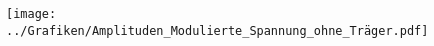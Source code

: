 
\FloatBarrier\begin{figure}[!h]
\centering
\texttt{[image: ../Grafiken/Amplituden\_Modulierte\_Spannung\_ohne\_Träger.pdf]}
\caption{\label{fig:amplituden_modulierte_spannung_ohne_träger}}
\end{figure}
\FloatBarrier